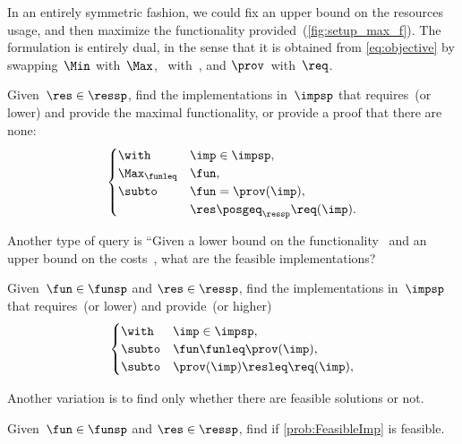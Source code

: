 In an entirely symmetric fashion, we could fix an upper bound on
the resources usage, and then maximize the functionality provided~(\cref{fig:setup_max_f}).
The formulation is entirely dual, in the sense that it is obtained
from \cref{eq:objective} by swapping~$\Min$ with~$\Max$, \funsp~with~\ressp,
and $\prov$~with~$\req$.

\begin{problem}[\FixResMinFun]
    Given~$\res\in\ressp$, find the implementations
    in~$\impsp$ that requires~\res (or lower)
    and provide the maximal functionality, or provide a proof that there are none:
    \begin{equation}
        \begin{cases}
            \with & \imp\in\impsp,\\
            \Max_{\funleq} & \fun,\\
            \subto & \fun=\prov(\imp),\\
            & \res\posgeq_{\ressp}\req(\imp).
        \end{cases}\label{eq:objective-1}
    \end{equation}
\end{problem}



Another type of query is
``Given a lower bound on the functionality~\fun
and an upper bound on the costs~\fun, what are the feasible implementations?


\begin{problem}[\FeasibleImp]\label{prob:FeasibleImp}
    Given~$\fun\in\funsp$ and $\res\in\ressp$, find the implementations
    in~$\impsp$ that requires~\res (or lower)
    and provide~\fun (or higher)
    \begin{equation}
        \begin{cases}
            \with & \imp\in\impsp,\\
            \subto & \fun \funleq \prov(\imp),\\
            \subto &  \prov(\imp) \resleq \req(\imp) ,\\
        \end{cases}
    \end{equation}
\end{problem}

Another variation is to find only whether there are feasible solutions or not.

\begin{problem}[\Feasibility]\label{prob:Feasibility}
    Given~$\fun\in\funsp$ and $\res\in\ressp$, find if \cref{prob:FeasibleImp} is feasible.
\end{problem}
